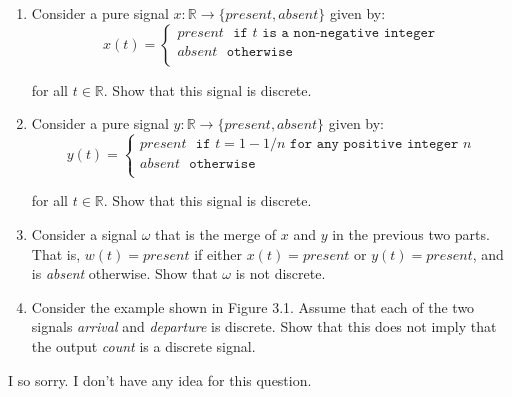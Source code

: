 \documentclass[12pt]{article}
\begin{document}
\begin{enumerate}
	\item Consider a pure signal $x:\mathbb{R} \rightarrow \{present, absent\}$ given by:\\
	$$
	x(t)=
	\begin{cases}
		present \ \ \  \texttt{if $t$ is a non-negative integer} \\
		absent \ \ \    \texttt{otherwise}\\
	\end{cases}
	$$
	
	for all $t \in \mathbb{R}$. Show that this signal is discrete.
	
	
	
	
	\item Consider a pure signal $y:\mathbb{R} \rightarrow \{present, absent\}$ given by:\\
	$$
	y(t)=
	\begin{cases}
		present \ \ \  \texttt{if $t=1-1/n$ for any positive integer $n$} \\
		absent \ \ \    \texttt{otherwise}\\
	\end{cases}
	$$
	
	for all $t \in \mathbb{R}$. Show that this signal is discrete.
	
	
	
	
	\item Consider a signal $\omega$ that is the merge of $x$ and $y$ in the previous two parts.
	That is, $w(t)=present$ if either $x(t) = present$ or $y(t) = present$, and is
	\textit{absent} otherwise. Show that $\omega$ is not discrete.
	
	
	
	\item Consider the example shown in Figure 3.1. Assume that each of the two
	signals \textit{arrival} and \textit{departure} is discrete. Show that this does not imply that
	the output \textit{count} is a discrete signal.
	
	
	
	
\end{enumerate}




\begin{qsolve}[Solution]
	I so sorry. I don't have any idea for this question.
\end{qsolve}
\vfil
\clearpage




\vspace*{\fill}
\begin{center}
	\makeendpage

\end{center}
\vfill %
\clearpage
\end{document}

